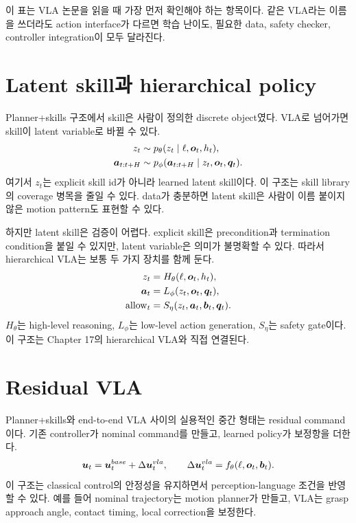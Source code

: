 이 표는 VLA 논문을 읽을 때 가장 먼저 확인해야 하는 항목이다. 같은 VLA라는 이름을 쓰더라도 action interface가 다르면 학습 난이도, 필요한 data, safety checker, controller integration이 모두 달라진다.

\section{Latent skill과 hierarchical policy}

Planner+skills 구조에서 skill은 사람이 정의한 discrete object였다. VLA로 넘어가면 skill이 latent variable로 바뀔 수 있다.
\begin{align}
  z_t &\sim p_{\theta}(z_t \mid \ell,\bm{o}_t,h_t), \\
  \bm{a}_{t:t+H} &\sim p_{\phi}(\bm{a}_{t:t+H} \mid z_t,\bm{o}_t,\bm{q}_t).
  \label{eq:latent-skill}
\end{align}
여기서 $z_t$는 explicit skill id가 아니라 learned latent skill이다. 이 구조는 skill library의 coverage 병목을 줄일 수 있다. data가 충분하면 latent skill은 사람이 이름 붙이지 않은 motion pattern도 표현할 수 있다.

하지만 latent skill은 검증이 어렵다. explicit skill은 precondition과 termination condition을 붙일 수 있지만, latent variable은 의미가 불명확할 수 있다. 따라서 hierarchical VLA는 보통 두 가지 장치를 함께 둔다.
\begin{equation}
  \begin{aligned}
  z_t &= H_{\theta}(\ell,\bm{o}_t,h_t), \\
  \bm{a}_t &= L_{\phi}(z_t,\bm{o}_t,\bm{q}_t), \\
  \mathrm{allow}_t &= S_{\eta}(z_t,\bm{a}_t,\bm{b}_t,\bm{q}_t).
  \end{aligned}
  \label{eq:hierarchical-vla-safety}
\end{equation}
$H_{\theta}$는 high-level reasoning, $L_{\phi}$는 low-level action generation, $S_{\eta}$는 safety gate이다. 이 구조는 Chapter 17의 hierarchical VLA와 직접 연결된다.

\section{Residual VLA}

Planner+skills와 end-to-end VLA 사이의 실용적인 중간 형태는 residual command이다. 기존 controller가 nominal command를 만들고, learned policy가 보정항을 더한다.
\begin{equation}
  \bm{u}_t
  =
  \bm{u}_t^{base}
  +
  \Delta \bm{u}_t^{vla},
  \qquad
  \Delta \bm{u}_t^{vla}
  =
  f_{\theta}(\ell,\bm{o}_t,\bm{b}_t).
  \label{eq:residual-vla}
\end{equation}
이 구조는 classical control의 안정성을 유지하면서 perception-language 조건을 반영할 수 있다. 예를 들어 nominal trajectory는 motion planner가 만들고, VLA는 grasp approach angle, contact timing, local correction을 보정한다.

